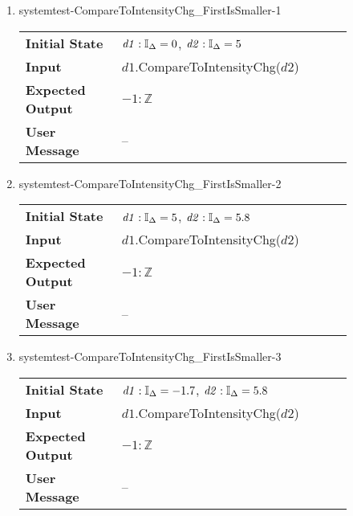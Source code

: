 \begin{enumerate}
    \item{systemtest-CompareToIntensityChg\_FirstIsSmaller-1}
    \begin{table}[H]
        \centering
        \begin{tabular}{P{0.25\linewidth}P{0.6\linewidth}}
            \toprule
            \textbf{Initial State} & $\mathit{d1} : \mathbb{I}_{\Delta} = 0$,
            $\mathit{d2} : \mathbb{I}_{\Delta} = 5$ \\
            \textbf{Input} & $\mathit{d1}$.CompareToIntensityChg($\mathit{d2}$)
            \\ \midrule
            \textbf{Expected Output} & $-1 : \mathbb{Z}$ \\
            \textbf{User Message} & -- \\ \bottomrule
        \end{tabular}
    \end{table}

    \item{systemtest-CompareToIntensityChg\_FirstIsSmaller-2}
    \begin{table}[H]
        \centering
        \begin{tabular}{P{0.25\linewidth}P{0.6\linewidth}}
            \toprule
            \textbf{Initial State} & $\mathit{d1} : \mathbb{I}_{\Delta} = 5$,
            $\mathit{d2} : \mathbb{I}_{\Delta} = 5.8$ \\
            \textbf{Input} & $\mathit{d1}$.CompareToIntensityChg($\mathit{d2}$)
            \\ \midrule
            \textbf{Expected Output} & $-1 : \mathbb{Z}$ \\
            \textbf{User Message} & -- \\ \bottomrule
        \end{tabular}
    \end{table}

    \item{systemtest-CompareToIntensityChg\_FirstIsSmaller-3}
    \begin{table}[H]
        \centering
        \begin{tabular}{P{0.25\linewidth}P{0.6\linewidth}}
            \toprule
            \textbf{Initial State} & $\mathit{d1} : \mathbb{I}_{\Delta} = -1.7$,
            $\mathit{d2} : \mathbb{I}_{\Delta} = 5.8$ \\
            \textbf{Input} & $\mathit{d1}$.CompareToIntensityChg($\mathit{d2}$)
            \\ \midrule
            \textbf{Expected Output} & $-1 : \mathbb{Z}$ \\
            \textbf{User Message} & -- \\ \bottomrule
        \end{tabular}
    \end{table}


\end{enumerate}

